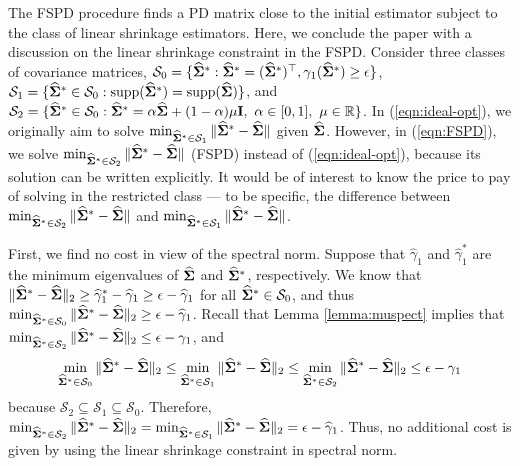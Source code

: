 \documentclass[times,sort&compress,3p]{elsarticle}
\newcommand{\MC}{\mathcal}
\begin{document}
The FSPD procedure finds a PD matrix close to the initial estimator subject to the class
of linear shrinkage estimators. Here, we conclude the paper with a discussion on the linear shrinkage
constraint in the FSPD. Consider three classes of covariance matrices,
 $\MC{S}_0 = \{ \widehat{\bf \Sigma}^* : \widehat{\bf \Sigma}^* = (\widehat{\bf \Sigma}^*)^{\top},
 \gamma_{1}(\widehat{\bf \Sigma}^*) \geq \epsilon \}$,
$\MC{S}_1 = \{ \widehat{\bf \Sigma}^* \in \MC{S}_0 : {\rm supp}(\widehat{\bf \Sigma}^*) =
{\rm supp}(\widehat{\bf \Sigma}) \}$, and
$\MC{S}_2 = \{ \widehat{\bf \Sigma}^* \in \MC{S}_0 : \widehat{\bf \Sigma}^* = \alpha
\widehat{\bf \Sigma} + (1 - \alpha) \mu {\bf I}, ~ \alpha \in [0,1], ~ \mu \in \mathbb{R} \}$.
In (\ref{eqn:ideal-opt}), we originally aim to solve
 $\min_{\widehat{\bf \Sigma}^* \in \MC{S}_1} \| \widehat{\bf \Sigma}^* -
\widehat{\bf \Sigma} \|$ given $\widehat{\bf \Sigma}$. However, in (\ref{eqn:FSPD}), we solve
 $\min_{\widehat{\bf \Sigma}^* \in \MC{S}_2} \| \widehat{\bf \Sigma}^* - \widehat{\bf \Sigma} \|$ (FSPD)
 instead of (\ref{eqn:ideal-opt}), because its solution can be written explicitly. It would be of interest
 to know the price to pay of solving in the restricted class --- to be specific,
 the difference between $\min_{\widehat{\bf \Sigma}^* \in \MC{S}_2} \|
 \widehat{\bf \Sigma}^* - \widehat{\bf \Sigma} \|$ and $\min_{\widehat{\bf \Sigma}^* \in \MC{S}_1} \|
  \widehat{\bf \Sigma}^* - \widehat{\bf \Sigma} \|$.


 First, we find no cost in view of the spectral norm.
 Suppose that $\widehat{\gamma}_{1}$ and $\widehat{\gamma}_{1}^*$ are
 the minimum eigenvalues of $\widehat{\bf \Sigma}$ and $\widehat{\bf \Sigma}^*$, respectively. We
know that $\| \widehat{\bf \Sigma}^* - \widehat{\bf \Sigma} \|_2 \geq  \widehat{\gamma}_{1}^* -
 \widehat{\gamma}_{1} \geq \epsilon - \widehat{\gamma}_{1}$
for all $\widehat{\bf \Sigma}^* \in \MC{S}_0$, and thus $\min_{\widehat{\bf \Sigma}^* \in \MC{S}_0} \|
\widehat{\bf \Sigma}^* - \widehat{\bf \Sigma} \|_2 \geq \epsilon - \widehat{\gamma}_{1}$. Recall
that Lemma \ref{lemma:muspect} implies that
$\min_{\widehat{\bf \Sigma}^* \in \MC{S}_2}  \|
\widehat{\bf \Sigma}^* - \widehat{\bf \Sigma} \|_2  \leq \epsilon - \gamma_{1}$, and
\begin{equation} \nonumber
\min_{\widehat{\bf \Sigma}^* \in \MC{S}_0}  \|
\widehat{\bf \Sigma}^* - \widehat{\bf \Sigma} \|_2  \leq \min_{\widehat{\bf \Sigma}^* \in \MC{S}_1}   \|
\widehat{\bf \Sigma}^* - \widehat{\bf \Sigma} \|_2 \leq \min_{\widehat{\bf \Sigma}^* \in \MC{S}_2}  \|
\widehat{\bf \Sigma}^* - \widehat{\bf \Sigma} \|_2 \leq \epsilon - \gamma_{1}
\end{equation}
because $\MC{S}_2 \subseteq \MC{S}_1 \subseteq \MC{S}_0$. Therefore,
$\min_{\widehat{\bf \Sigma}^* \in \MC{S}_2} \|
 \widehat{\bf \Sigma}^* - \widehat{\bf \Sigma} \|_2 = \min_{\widehat{\bf \Sigma}^* \in \MC{S}_1} \| \widehat{\bf \Sigma}^*
 - \widehat{\bf \Sigma}\|_2 = \epsilon - \widehat{\gamma}_{1}$. Thus, no additional cost is given by using the linear shrinkage
 constraint in spectral norm.
\end{document}
